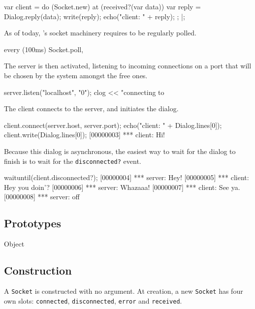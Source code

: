 \begin{urbiscript}
var client =
  do (Socket.new)
  {
    at (received?(var data))
    {
      var reply = Dialog.reply(data);
      write(reply);
      echo("client: " + reply);
    };
  }|;
\end{urbiscript}

As of today, \us's socket machinery requires to be regularly polled.

\begin{urbiscript}
every (100ms)
  Socket.poll,
\end{urbiscript}

The server is then activated, listening to incoming connections on a
port that will be chosen by the system amongst the free ones.

\begin{urbiscript}
server.listen("localhost", "0");
clog << "connecting to %
\end{urbiscript}

The client connects to the server, and initiates the dialog.

\begin{urbiscript}
client.connect(server.host, server.port);
echo("client: " + Dialog.lines[0]);
client.write(Dialog.lines[0]);
[00000003] *** client: Hi!
\end{urbiscript}

Because this dialog is asynchronous, the easiest way to wait for the
dialog to finish is to wait for the \lstinline|disconnected?| event.

\begin{urbiscript}
waituntil(client.disconnected?);
[00000004] *** server: Hey!
[00000005] *** client: Hey you doin'?
[00000006] *** server: Whazaaa!
[00000007] *** client: See ya.
[00000008] *** server: off
\end{urbiscript}

\subsection{Prototypes}
\begin{refObjects}
\item[Object]
\end{refObjects}

\subsection{Construction}

A \lstinline|Socket| is constructed with no argument. At creation, a
new \lstinline|Socket| has four own slots: \lstinline|connected|,
\lstinline|disconnected|, \lstinline|error| and \lstinline|received|.

